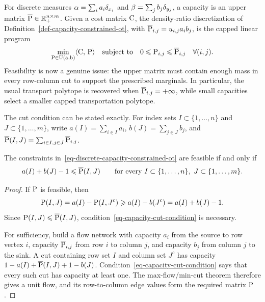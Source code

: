 For discrete measures $\alpha=\sum_i a_i\de_{x_i}$ and $\beta=\sum_j b_j\de_{y_j}$, a capacity is an upper matrix $\overline{\P}\in\RR_+^{n\times m}$. Given a cost matrix $\C$, the density-ratio discretization of Definition~\ref{def-capacity-constrained-ot}, with $\overline{\P}_{i,j}=u_{i,j}a_i b_j$, is the capped linear program
\begin{equation}\label{eq-discrete-capacity-constrained-ot}
	\min_{\P\in\CouplingsD(\a,\b)}
	\dotp{\C}{\P}
	\quad\text{subject to}\quad
	0\leq \P_{i,j}\leq \overline{\P}_{i,j}\quad\forall(i,j).
\end{equation}
Feasibility is now a genuine issue: the upper matrix must contain enough mass in every row-column cut to support the prescribed marginals. In particular, the usual transport polytope is recovered when $\overline{\P}_{i,j}=+\infty$, while small capacities select a smaller capped transportation polytope.

The cut condition can be stated exactly. For index sets $I\subset\{1,\ldots,n\}$ and $J\subset\{1,\ldots,m\}$, write $a(I)=\sum_{i\in I}a_i$, $b(J)=\sum_{j\in J}b_j$, and $\overline{\P}(I,J)=\sum_{i\in I,j\in J}\overline{\P}_{i,j}$.

\begin{prop}\label{prop-capacity-feasibility}
	The constraints in~\eqref{eq-discrete-capacity-constrained-ot} are feasible if and only if
	\begin{equation}\label{eq-capacity-cut-condition}
		a(I)+b(J)-1\leq \overline{\P}(I,J)
		\qquad
		\text{for every }I\subset\{1,\ldots,n\},\ J\subset\{1,\ldots,m\}.
	\end{equation}
\end{prop}

\begin{proof}
	If $\P$ is feasible, then
	\[
		\P(I,J)
		=
		a(I)-\P(I,J^c)
		\geq
		a(I)-b(J^c)
		=
		a(I)+b(J)-1.
	\]
	Since $\P(I,J)\leq \overline{\P}(I,J)$, condition~\eqref{eq-capacity-cut-condition} is necessary.

	For sufficiency, build a flow network with capacity $a_i$ from the source to row vertex $i$, capacity $\overline{\P}_{i,j}$ from row $i$ to column $j$, and capacity $b_j$ from column $j$ to the sink. A cut containing row set $I$ and column set $J^c$ has capacity
	\(1-a(I)+\overline{\P}(I,J)+1-b(J)\).
	Condition~\eqref{eq-capacity-cut-condition} says that every such cut has capacity at least one. The max-flow/min-cut theorem therefore gives a unit flow, and its row-to-column edge values form the required matrix $\P$.
\end{proof}

